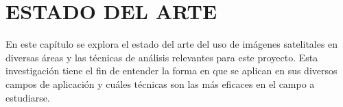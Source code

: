 \section{ESTADO DEL ARTE}

En este capítulo se explora el estado del arte del uso de imágenes satelitales en diversas áreas y las técnicas
de análisis relevantes para este proyecto. Esta investigación tiene el fin de entender la forma en que se aplican en sus
diversos campos de aplicación y cuáles técnicas son las más eficaces en el campo a estudiarse.

